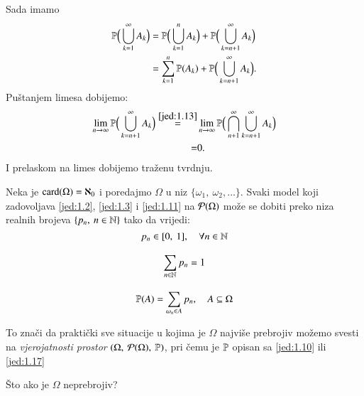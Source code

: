 \begin{rj}[\ref{zad:1.12}]
\begin{enumerate}[label=(\alph*)]
        Sada imamo
        \begin{align*}
            \mathbb{P} \Big(\bigcup\limits_{k = 1}^{\infty} A_k \Big)
            &= \mathbb{P} \Big( \bigcup\limits_{k = 1}^{n} A_k \Big)
            + \mathbb{P} \Big( \bigcup\limits_{k = n + 1}^{\infty} A_k \Big) \\
            &= \sum\limits_{k = 1}^{n} \mathbb{P}({A_k})
            + \mathbb{P} \Big( \bigcup\limits_{k = n + 1}^{\infty} A_k \Big). 
        \end{align*}
        Pu\v stanjem limesa dobijemo:
        \begin{align*}
            \lim\limits_{n \to \infty} \mathbb{P} \Big( \bigcup\limits_{k = n + 1}^{\infty} A_k \Big)
            \overset{\eqref{jed:1.13}}{=}& \lim\limits_{n \to \infty}
            \mathbb{P} \Big( \bigcap\limits_{n + 1}^{\infty}\bigcup\limits_{k = n + 1}^{\infty} A_k \Big)\\
            =& 0.
            \end{align*}
        I prelaskom na limes dobijemo tra\v zenu tvrdnju.
    \end{enumerate}
\end{rj}

\begin{pr} \label{pr:1.14}
    Neka je $\mathrm{card}({\Omega}) = \aleph_0$ i poredajmo $\Omega$ u niz $\{ \omega_1, \: \omega_2, \dots \}$.
    Svaki model koji zadovoljava \eqref{jed:1.2}, \eqref{jed:1.3} i \eqref{jed:1.11} na $\mathcal{P}({\Omega})$ mo\v ze se dobiti preko niza realnih brojeva $\{p_n, \: n \in \mathbb{N} \}$ tako da vrijedi:
    \begin{equation}   %
        p_n \in [0, \: 1], \quad \forall n \in \N
    \end{equation}

    \begin{equation}
        \sum\limits_{n \in \mathbb{N}}^{} p_n = 1
    \end{equation}

    \begin{equation} \label{jed:1.17}
        \mathbb{P}({A}) = \sum\limits_{\omega_n \in A}^{} p_n, \quad A
            \subseteq \Omega
    \end{equation}
\end{pr}

To zna\v ci da prakti\v cki sve situacije u kojima je $\Omega$ najvi\v se prebrojiv mo\v zemo svesti na \emph{vjerojatnosti prostor} $(\Omega, \: \mathcal{P}({\Omega}), \: \mathbb{P})$, pri \v cemu je $\mathbb{P}$ opisan sa \eqref{jed:1.10} ili \eqref{jed:1.17}

\v Sto ako je $\Omega$ neprebrojiv?

